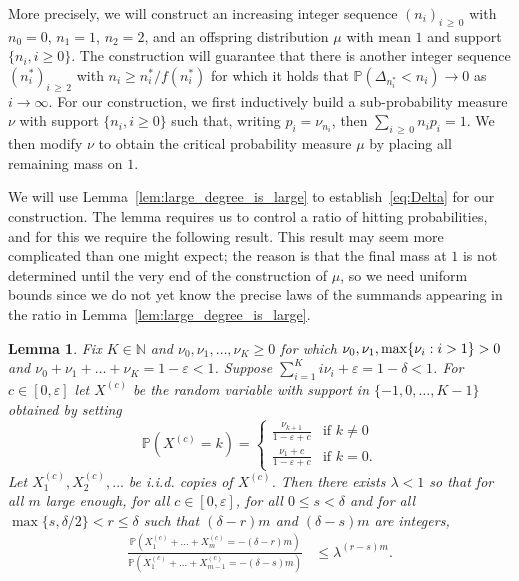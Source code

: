 \documentclass[10pt]{amsart}
\newtheorem{lemm}[theo]{Lemma}\newtheorem{prop}[theo]{Proposition}\newtheorem{coro}[theo]{Corollary}\newtheorem{conj}[theo]{Conjecture}
\theoremstyle{definition}\newtheorem{defi}[theo]{Definition}\newtheorem{rema}[theo]{Remark}\newtheorem{exam}[theo]{Example}\newtheorem{exem}[theo]{Example}\newtheorem{nota}[theo]{Notation}
\newcommand{\N}{\mathbb{N}}
\renewcommand{\P}{\mathbb{P}}
\begin{document}
More precisely, we will construct an increasing integer sequence $(n_i)_{i\,\ge\,0}$ with $n_0=0$, $n_1=1$, $n_2=2$, and an offspring distribution $\mu$ with mean $1$ and support $\{n_i,i \ge 0\}$. The construction will guarantee that there is another integer sequence $(n^*_i)_{i\,\geq\,2}$ with $n_i\geq n^*_i/f(n^*_i)$ for which it holds that $
\P(\Delta_{n^*_i}< n_i)\to 0 $ as $i\to \infty$. For our construction, we first inductively build a sub-probability measure $\nu$ with support $\{n_i,i \ge 0\}$ such that, writing $p_i=\nu_{n_i}$, then $\sum_{i\,\ge\,0} n_ip_i=1$. We then modify $\nu$ to obtain the critical probability measure $\mu$ by placing all remaining mass on $1$.

We will use Lemma~\ref{lem:large_degree_is_large} to establish~\eqref{eq:Delta} for our construction. The lemma requires us to control a ratio of hitting probabilities, and for this we require the following {result}. This {result} may seem more complicated than one might expect; the reason is that the final mass at $1$ is not determined until the very end of the construction of $\mu$, so {we need uniform bounds since }we do not yet know the precise laws of the summands appearing in the ratio in Lemma~\ref{lem:large_degree_is_large}.

\begin{lemm}\label{lem:localLDP}
Fix $K\in \N$ and $\nu_{0},\nu_1,\dots, \nu_K\ge 0$ for which $\nu_{0},\nu_1,{\max\{\nu_i:i>1\}}\linebreak>0$ and $\nu_{0}+\nu_1+\dots+\nu_K=1-\varepsilon<1$. Suppose $\sum_{i=1}^K i\nu_i+\varepsilon=1-\delta<1$. For $c\in [0,\varepsilon]$ let $X^{(c)}$ be the random variable with support in $\{-1,0,\dots, K-1\}$ obtained by setting
\[
\P(X^{(c)}=k)=
\begin{cases}
\frac{\nu_{k+1}}{ 1-\varepsilon +c } &\text{if }k\neq 0 \\ \frac{\nu_1+c}{1-\varepsilon+c} &\text{if }k=0.
\end{cases}
\]
Let $X^{(c)}_1,X^{(c)}_2,\dots$ be i.i.d. copies of $X^{(c)}$. Then there exists $\lambda<1$ so that for all $m$ large enough, for all $c\in [0,\varepsilon]$, for all $0\leq s <\delta$ and for all $\max\{s,\delta/2\}< r\le \delta $ such that $(\delta-r)m$ and $(\delta-s)m$ are integers,
\begin{align}\label{eq:exp_tails_multinom}
\frac{\P\left(X^{(c)}_1+\dots+X^{(c)}_{m}=-(\delta-r)m\right)}{
\P\left(X^{(c)}_1+\dots+X^{(c)}_{m-1}=-(\delta-s)m\right)}&\leq \lambda^{(r-s)m}.
\end{align}
\end{lemm}
\end{document}
